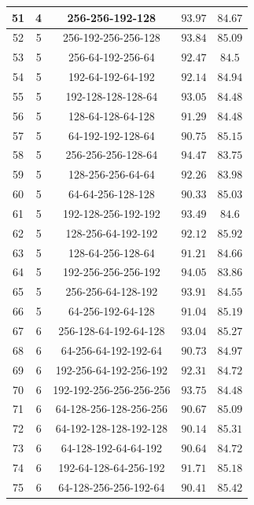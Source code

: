 \documentclass{article}
\begin{document}
\begin{longtable}{|c|c|c|c|c|}
        51 & 4 &  256-256-192-128 & $93.97$ & $84.67$ \\ \hline
        52 & 5 &  256-192-256-256-128 & $93.84$ & $85.09$ \\ \hline
        53 & 5 &  256-64-192-256-64 & $92.47$ & $84.5$ \\ \hline
        54 & 5 &  192-64-192-64-192 & $92.14$ & $84.94$ \\ \hline
        55 & 5 &  192-128-128-128-64 & $93.05$ & $84.48$ \\ \hline
        56 & 5 &  128-64-128-64-128 & $91.29$ & $84.48$ \\ \hline
        57 & 5 &  64-192-192-128-64 & $90.75$ & $85.15$ \\ \hline
        58 & 5 &  256-256-256-128-64 & $94.47$ & $83.75$ \\ \hline
        59 & 5 &  128-256-256-64-64 & $92.26$ & $83.98$ \\ \hline
        60 & 5 &  64-64-256-128-128 & $90.33$ & $85.03$ \\ \hline
        61 & 5 &  192-128-256-192-192 & $93.49$ & $84.6$ \\ \hline
        62 & 5 &  128-256-64-192-192 & $92.12$ & $85.92$ \\ \hline
        63 & 5 &  128-64-256-128-64 & $91.21$ & $84.66$ \\ \hline
        64 & 5 &  192-256-256-256-192 & $94.05$ & $83.86$ \\ \hline
        65 & 5 &  256-256-64-128-192 & $93.91$ & $84.55$ \\ \hline
        66 & 5 &  64-256-192-64-128 & $91.04$ & $85.19$ \\ \hline
        67 & 6 &  256-128-64-192-64-128 & $93.04$ & $85.27$ \\ \hline
        68 & 6 &  64-256-64-192-192-64 & $90.73$ & $84.97$ \\ \hline
        69 & 6 &  192-256-64-192-256-192 & $92.31$ & $84.72$ \\ \hline
        70 & 6 &  192-192-256-256-256-256 & $93.75$ & $84.48$ \\ \hline
        71 & 6 &  64-128-256-128-256-256 & $90.67$ & $85.09$ \\ \hline
        72 & 6 &  64-192-128-128-192-128 & $90.14$ & $85.31$ \\ \hline
        73 & 6 &  64-128-192-64-64-192 & $90.64$ & $84.72$ \\ \hline
        74 & 6 &  192-64-128-64-256-192 & $91.71$ & $85.18$ \\ \hline
        75 & 6 &  64-128-256-256-192-64 & $90.41$ & $85.42$ \\ \hline

\end{longtable}
\end{document}
